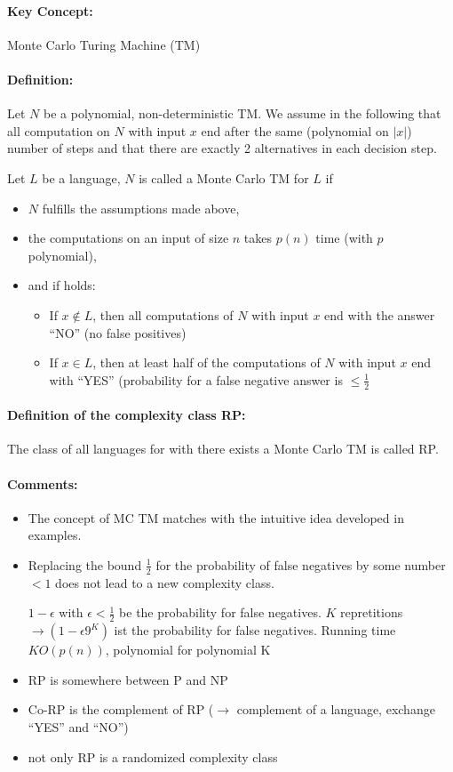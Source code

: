 \documentclass[11pt]{article}
\theoremstyle{definition}
\theoremstyle{definition}
\begin{document}
\paragraph{Key Concept:} Monte Carlo Turing Machine (TM)

\paragraph{Definition: } Let $ N $ be a polynomial, non-deterministic TM. We assume in the following that all computation on $ N $ with input $ x $ end after the same (polynomial on $ |x| $) number of steps and that there are exactly 2 alternatives in each decision step.

Let $ L $ be a language, $ N $ is called a Monte Carlo TM for $ L $ if
\begin{itemize}
\item $ N $ fulfills the assumptions made above,
\item the computations on an input of size $ n $ takes $ p(n) $ time (with $ p $ polynomial),
\item and if holds:
	\begin{itemize}
	\item If $ x \not\in L $, then all computations of $ N $ with input $ x $ end with the answer ``NO'' (no false positives)
	\item If $ x \in L $, then at least half of the computations of $ N $ with input $ x $ end with ``YES'' (probability for a false negative answer is $ \leq \frac{1}{2} $
	\end{itemize}
\end{itemize}

\paragraph{Definition of the complexity class RP:} The class of all languages for with there exists a Monte Carlo TM is called RP.

\paragraph{Comments:}
\begin{itemize}
\item The concept of MC TM matches with the intuitive idea developed in examples.
\item Replacing the bound $ \frac{1}{2} $ for the probability of false negatives by some number $ < 1 $ does not lead to a new complexity class.

$ 1 - \epsilon $ with $ \epsilon < \frac{1}{2} $ be the probability for false negatives. $ K $ repretitions $ \rightarrow (1- \epsilon9^K ) $ ist the probability for false negatives. Running time $ K O (p (n)) $, polynomial for polynomial K
\item RP is somewhere between P and NP
\item Co-RP is the complement of RP ($ \rightarrow $ complement of a language, exchange ``YES'' and ``NO'')
\item not only RP is a randomized complexity class
\end{itemize}
\end{document}
